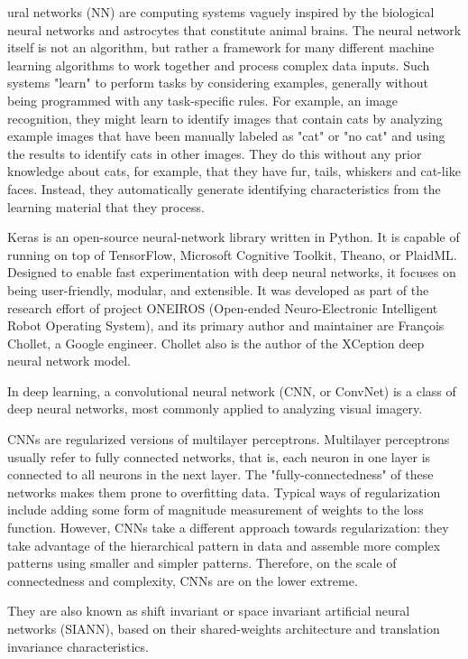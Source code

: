 \documentclass[journal,12pt,onecolumn,draftclsnofoot,]{IEEEtran}
\begin{document}
ural networks (NN) are computing systems vaguely inspired by the biological neural networks and astrocytes that constitute animal brains. The neural network itself is not an algorithm, but rather a framework for many different machine learning algorithms to work together and process complex data inputs. Such systems "learn" to perform tasks by considering examples, generally without being programmed with any task-specific rules. For example, an image recognition, they might learn to identify images that contain cats by analyzing example images that have been manually labeled as "cat" or "no cat" and using the results to identify cats in other images. They do this without any prior knowledge about cats, for example, that they have fur, tails, whiskers and cat-like faces. Instead, they automatically generate identifying characteristics from the learning material that they process.

Keras is an open-source neural-network library written in Python. It is capable of running on top of TensorFlow, Microsoft Cognitive Toolkit, Theano, or PlaidML. Designed to enable fast experimentation with deep neural networks, it focuses on being user-friendly, modular, and extensible. It was developed as part of the research effort of project ONEIROS (Open-ended Neuro-Electronic Intelligent Robot Operating System), and its primary author and maintainer are François Chollet, a Google engineer. Chollet also is the author of the XCeption deep neural network model.

In deep learning, a convolutional neural network (CNN, or ConvNet) is a class of deep neural networks, most commonly applied to analyzing visual imagery.

CNNs are regularized versions of multilayer perceptrons. Multilayer perceptrons usually refer to fully connected networks, that is, each neuron in one layer is connected to all neurons in the next layer. The "fully-connectedness" of these networks makes them prone to overfitting data. Typical ways of regularization include adding some form of magnitude measurement of weights to the loss function. However, CNNs take a different approach towards regularization: they take advantage of the hierarchical pattern in data and assemble more complex patterns using smaller and simpler patterns. Therefore, on the scale of connectedness and complexity, CNNs are on the lower extreme.

They are also known as shift invariant or space invariant artificial neural networks (SIANN), based on their shared-weights architecture and translation invariance characteristics.
\end{document}
